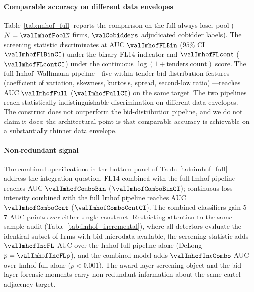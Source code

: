 \paragraph{Comparable accuracy on different data envelopes}
Table~\ref{tab:imhof_full} reports the comparison on the full
always-loser pool ($N = \valImhofPoolN$ firms, $\valCobidders$
adjudicated cobidder labels). The screening statistic
discriminates at AUC $\valImhofFLBin$ ($95\%$ CI
$\valImhofFLBinCI$) under the binary FL14 indicator and
$\valImhofFLcont$ ($\valImhofFLcontCI$) under the continuous
$\log(1+\text{tenders\_count})$ score. The full
Imhof--Wallimann pipeline---five within-tender bid-distribution
features (coefficient of variation, skewness, kurtosis, spread,
second-low ratio)
\citep{imhof2019detecting,wallimann2023machine}---reaches AUC
$\valImhofFull$ ($\valImhofFullCI$) on the same target. The
two pipelines reach statistically indistinguishable
discrimination on different data envelopes. The construct does
not outperform the bid-distribution pipeline, and we do not
claim it does; the architectural point is that comparable
accuracy is achievable on a substantially thinner data envelope.



\paragraph{Non-redundant signal} The combined specifications in
the bottom panel of Table~\ref{tab:imhof_full} address the
integration question. FL14 combined with the full Imhof
pipeline reaches AUC $\valImhofComboBin$ ($\valImhofComboBinCI$);
continuous loss intensity combined with the full Imhof pipeline
reaches AUC $\valImhofComboCont$ ($\valImhofComboContCI$). The
combined classifiers gain $5$--$7$ AUC points over either single
construct. Restricting attention to the same-sample audit
(Table~\ref{tab:imhof_incremental}), where all detectors
evaluate the identical subset of firms with bid microdata
available, the screening statistic adds $\valImhofIncFL$ AUC
over the Imhof full pipeline alone (DeLong $p = \valImhofIncFLp$),
and the combined model adds $\valImhofIncCombo$ AUC over Imhof
full alone ($p < 0.001$). The award-layer screening object and
the bid-layer forensic moments carry non-redundant information
about the same cartel-adjacency target.

